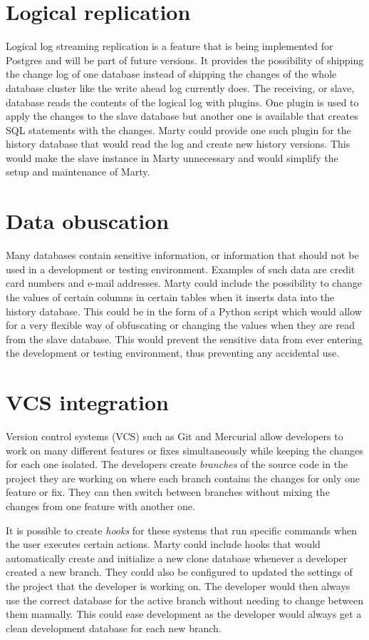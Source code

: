 \section{Logical replication}
Logical log streaming replication is a feature that is being implemented for Postgres and will be part of future versions.
It provides the possibility of shipping the change log of one database instead of shipping the changes of the whole database cluster like the write ahead log currently does.
The receiving, or slave, database reads the contents of the logical log with plugins.
One plugin is used to apply the changes to the slave database but another one is available that creates SQL statements with the changes.
Marty could provide one such plugin for the history database that would read the log and create new history versions.
This would make the slave instance in Marty unnecessary and would simplify the setup and maintenance of Marty.

\section{Data obuscation}
Many databases contain sensitive information, or information that should not be used in a development or testing environment.
Examples of such data are credit card numbers and e-mail addresses.
Marty could include the possibility to change the values of certain columns in certain tables when it inserts data into the history database.
This could be in the form of a Python script which would allow for a very flexible way of obfuscating or changing the values when they are read from the slave database.
This would prevent the sensitive data from ever entering the development or testing environment, thus preventing any accidental use.

\section{VCS integration}
Version control systems (VCS) such as Git and Mercurial allow developers to work on many different features or fixes simultaneously while keeping the changes for each one isolated.
The developers create \textit{branches} of the source code in the project they are working on where each branch contains the changes for only one feature or fix.
They can then switch between branches without mixing the changes from one feature with another one.

It is possible to create \textit{hooks} for these systems that run specific commands when the user executes certain actions.
Marty could include hooks that would automatically create and initialize a new clone database whenever a developer created a new branch.
They could also be configured to updated the settings of the project that the developer is working on.
The developer would then always use the correct database for the active branch without needing to change between them manually.
This could ease development as the developer would always get a clean development database for each new branch.

